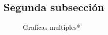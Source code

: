 \documentclass[12pt]{article}
\begin{document}
\begin{multicols}{2}
\subsection{Segunda subsección}
\begin{figure}[hb]
\centering
{} \hspace{0.3cm}
\caption{Grafícas multiples*}
\end{figure}


\end{multicols}
\end{document}
